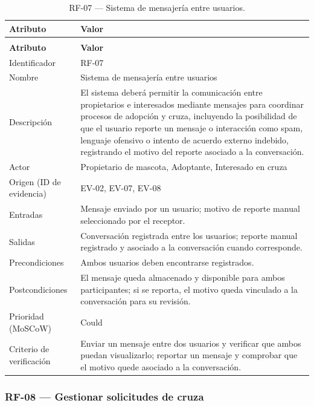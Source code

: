 \documentclass[journal,onecolumn]{IEEEtran}
\makeatletter
\newenvironment{atributos}[2]{%
	\small
	\begin{longtable}{@{}>{\raggedright\arraybackslash}p{4.2cm} >{\raggedright\arraybackslash}p{11.2cm}@{}}
		\caption{#2}\label{tab:#1}\\
		\toprule
		\textbf{Atributo} & \textbf{Valor} \\
		\midrule
		\endfirsthead
		\multicolumn{2}{@{}l}{\small\itshape (continuación)}\\
		\toprule
		\textbf{Atributo} & \textbf{Valor} \\
		\midrule
		\endhead
		\bottomrule
		\endlastfoot
	}{%
	\end{longtable}
	\normalsize
}
\makeatother
\begin{document}
	\begin{atributos}{RF-07}{RF-07 --- Sistema de mensajería entre usuarios.}
		Identificador & RF-07 \\
		Nombre & Sistema de mensajería entre usuarios \\
		Descripción & El sistema deberá permitir la comunicación entre propietarios e interesados mediante mensajes para coordinar procesos de adopción y cruza, incluyendo la posibilidad de que el usuario reporte un mensaje o interacción como spam, lenguaje ofensivo o intento de acuerdo externo indebido, registrando el motivo del reporte asociado a la conversación. \\
		Actor & Propietario de mascota, Adoptante, Interesado en cruza \\
		Origen (ID de evidencia) & EV-02, EV-07, EV-08 \\
		Entradas & Mensaje enviado por un usuario; motivo de reporte manual seleccionado por el receptor. \\
		Salidas & Conversación registrada entre los usuarios; reporte manual registrado y asociado a la conversación cuando corresponde. \\
		Precondiciones & Ambos usuarios deben encontrarse registrados. \\
		Postcondiciones & El mensaje queda almacenado y disponible para ambos participantes; si se reporta, el motivo queda vinculado a la conversación para su revisión. \\
		Prioridad (MoSCoW) & Could \\
		Criterio de verificación & Enviar un mensaje entre dos usuarios y verificar que ambos puedan visualizarlo; reportar un mensaje y comprobar que el motivo quede asociado a la conversación. \\
	\end{atributos}
	

	\subsubsection{RF-08 --- Gestionar solicitudes de cruza}
	
\end{document}
